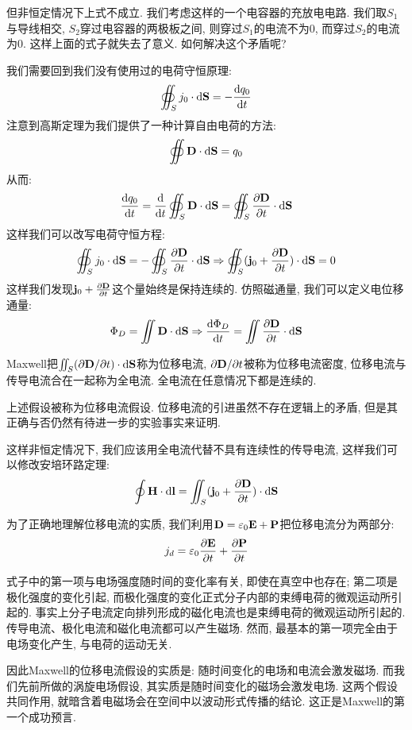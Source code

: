 
但非恒定情况下上式不成立. 我们考虑这样的一个电容器的充放电电路. 我们取$S_1$与导线相交, $S_2$穿过电容器的两极板之间, 则穿过$S_1$的电流不为$0$, 而穿过$S_2$的电流为$0$. 这样上面的式子就失去了意义. 如何解决这个矛盾呢?

我们需要回到我们没有使用过的电荷守恒原理:
\[
\oiint_S j_0 \cdot \mathop{}\!\mathrm{d} \mathbf{S} = -\frac{\mathop{}\!\mathrm{d} q_0}{\mathop{}\!\mathrm{d} t}
\]
注意到高斯定理为我们提供了一种计算自由电荷的方法:
\[
\oiint \mathbf{D} \cdot \mathop{}\!\mathrm{d} \mathbf{S} = q_0
\]
从而:
\[
\frac{\mathop{}\!\mathrm{d} q_0}{\mathop{}\!\mathrm{d} t} = \frac{\mathop{}\!\mathrm{d}}{\mathop{}\!\mathrm{d} t}\oiint_S \mathbf{D} \cdot \mathop{}\!\mathrm{d} \mathbf{S} = \oiint_S \frac{\partial \mathbf{D}}{\partial t} \cdot \mathop{}\!\mathrm{d} \mathbf{S}
\]
这样我们可以改写电荷守恒方程:
\[
\oiint_S j_0 \cdot \mathop{}\!\mathrm{d} \mathbf{S} = -\oiint_S \frac{\partial \mathbf{D}}{\partial t} \cdot \mathop{}\!\mathrm{d} \mathbf{S} \Rightarrow \oiint_S (\mathbf{j}_0+\frac{\partial \mathbf{D}}{\partial t})\cdot \mathop{}\!\mathrm{d} \mathbf{S} = 0
\]
这样我们发现$\mathbf{j}_0+\frac{\partial \mathbf{D}}{\partial t}$这个量始终是保持连续的. 仿照磁通量, 我们可以定义电位移通量:
\[
\Phi_D = \iint \mathbf{D} \cdot \mathop{}\!\mathrm{d} \mathbf{S} \Rightarrow \frac{\mathop{}\!\mathrm{d} \Phi_D}{\mathop{}\!\mathrm{d} t} = \iint \frac{\partial \mathbf{D}}{\partial t}\cdot \mathop{}\!\mathrm{d} \mathbf{S}
\]

Maxwell把$\iint_S(\partial\mathbf{D}/\partial t)\cdot\mathop{}\!\mathrm{d}\mathbf{S}$称为位移电流, $\partial\mathbf{D}/\partial t$被称为位移电流密度, 位移电流与传导电流合在一起称为全电流. 全电流在任意情况下都是连续的.

上述假设被称为位移电流假设. 位移电流的引进虽然不存在逻辑上的矛盾, 但是其正确与否仍然有待进一步的实验事实来证明.

这样非恒定情况下, 我们应该用全电流代替不具有连续性的传导电流, 这样我们可以修改安培环路定理:
\[
\oint \mathbf{H} \cdot \mathop{}\!\mathrm{d} \mathbf{l} = \iint_S (\mathbf{j}_0+\frac{\partial \mathbf{D}}{\partial t})\cdot \mathop{}\!\mathrm{d} \mathbf{S}
\]

为了正确地理解位移电流的实质, 我们利用$\mathbf{D} = \mathop{}\!\varepsilon_0 \mathbf{E} + \mathbf{P}$把位移电流分为两部分:
\[
j_d = \mathop{}\!\varepsilon_0 \frac{\partial \mathbf{E}}{\partial t}+\frac{\partial \mathbf{P}}{\partial t}
\]

式子中的第一项与电场强度随时间的变化率有关, 即使在真空中也存在; 第二项是极化强度的变化引起, 而极化强度的变化正式分子内部的束缚电荷的微观运动所引起的. 事实上分子电流定向排列形成的磁化电流也是束缚电荷的微观运动所引起的. 传导电流、极化电流和磁化电流都可以产生磁场. 然而, 最基本的第一项完全由于电场变化产生, 与电荷的运动无关.

因此Maxwell的位移电流假设的实质是: 随时间变化的电场和电流会激发磁场. 而我们先前所做的涡旋电场假设, 其实质是随时间变化的磁场会激发电场. 这两个假设共同作用, 就暗含着电磁场会在空间中以波动形式传播的结论. 这正是Maxwell的第一个成功预言.

